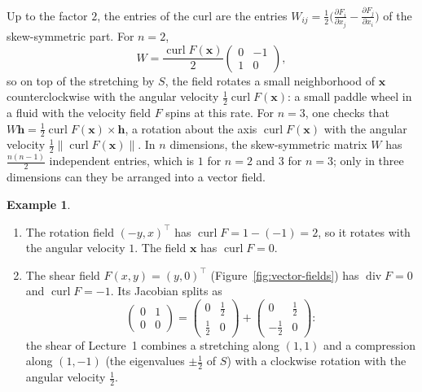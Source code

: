 \documentclass[11pt]{article}
\newcommand{\norm}[1]{\lVert #1 \rVert}
\theoremstyle{definition}
\newtheorem{example}[definition]{Example}
\theoremstyle{plain}
\theoremstyle{remark}
\DeclareMathOperator{\Div}{div}
\DeclareMathOperator{\curl}{curl}
\begin{document}
Up to the factor $2$, the entries of the curl are the entries $W_{ij} = \frac{1}{2}\big(\frac{\partial F_i}{\partial x_j} - \frac{\partial F_j}{\partial x_i}\big)$ of the skew-symmetric part. For $n = 2$,
\[W = \frac{\curl F(\mathbf{x})}{2}\begin{pmatrix} 0 & -1 \\ 1 & 0 \end{pmatrix},\]
so on top of the stretching by $S$, the field rotates a small neighborhood of $\mathbf{x}$ counterclockwise with the angular velocity $\frac{1}{2}\curl F(\mathbf{x})$: a small paddle wheel in a fluid with the velocity field $F$ spins at this rate. For $n = 3$, one checks that $W\mathbf{h} = \frac{1}{2}\curl F(\mathbf{x}) \times \mathbf{h}$, a rotation about the axis $\curl F(\mathbf{x})$ with the angular velocity $\frac{1}{2}\norm{\curl F(\mathbf{x})}$. In $n$ dimensions, the skew-symmetric matrix $W$ has $\frac{n(n - 1)}{2}$ independent entries, which is $1$ for $n = 2$ and $3$ for $n = 3$; only in three dimensions can they be arranged into a vector field.

\begin{example}\label{ex:curl}
    \begin{enumerate}
        \item The rotation field $(-y, x)^\top$ has $\curl F = 1 - (-1) = 2$, so it rotates with the angular velocity $1$. The field $\mathbf{x}$ has $\curl F = 0$.
        \item The shear field $F(x, y) = (y, 0)^\top$ (Figure~\ref{fig:vector-fields}) has $\Div F = 0$ and $\curl F = -1$. Its Jacobian splits as
        \[\begin{pmatrix} 0 & 1 \\ 0 & 0 \end{pmatrix} = \begin{pmatrix} 0 & \frac{1}{2} \\ \frac{1}{2} & 0 \end{pmatrix} + \begin{pmatrix} 0 & \frac{1}{2} \\ -\frac{1}{2} & 0 \end{pmatrix}:\]
        the shear of Lecture~1 combines a stretching along $(1, 1)$ and a compression along $(1, -1)$ (the eigenvalues $\pm\frac{1}{2}$ of $S$) with a clockwise rotation with the angular velocity $\frac{1}{2}$.
    \end{enumerate}
\end{example}
\end{document}
